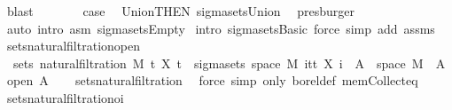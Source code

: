 \begin{isabellebody}
\ blast\isanewline
\ \ \ \ \isamarkupfalse%
\ \isamarkupfalse%
\ {\isacharquery}{\kern0pt}case\ \isamarkupfalse%
\ Union{\isacharparenleft}{\kern0pt}{}{\isacharparenright}{\kern0pt}{\isacharbrackleft}{\kern0pt}THEN\ sigma{\isacharunderscore}{\kern0pt}sets{\isachardot}{\kern0pt}Union{\isacharbrackright}{\kern0pt}\ \isamarkupfalse%
\ presburger\isanewline
\ \ \isamarkupfalse%
\ {\isacharparenleft}{\kern0pt}auto\ intro{\isacharcolon}{\kern0pt}\ asm\ sigma{\isacharunderscore}{\kern0pt}sets{\isachardot}{\kern0pt}Empty{\isacharparenright}{\kern0pt}\isanewline
{}\isamarkupfalse%
\ {\isacharparenleft}{\kern0pt}intro\ sigma{\isacharunderscore}{\kern0pt}sets{\isachardot}{\kern0pt}Basic{\isacharcomma}{\kern0pt}\ force\ simp\ add{\isacharcolon}{\kern0pt}\ assms{\isacharparenright}{\kern0pt}%
\endisatagproof
{\isafoldproof}%
%
\isadelimproof
\isanewline
%
\endisadelimproof
\isanewline
{}\isamarkupfalse%
\ sets{\isacharunderscore}{\kern0pt}natural{\isacharunderscore}{\kern0pt}filtration{\isacharunderscore}{\kern0pt}open{\isacharcolon}{\kern0pt}\ \isanewline
\ \ {\isachardoublequoteopen}sets\ {\isacharparenleft}{\kern0pt}natural{\isacharunderscore}{\kern0pt}filtration\ M\ t\ X\ t{\isacharparenright}{\kern0pt}\ {\isacharequal}{\kern0pt}\ sigma{\isacharunderscore}{\kern0pt}sets\ {\isacharparenleft}{\kern0pt}space\ M{\isacharparenright}{\kern0pt}\ {\isacharparenleft}{\kern0pt}{\isasymUnion}i{\isasymin}{\isacharbraceleft}{\kern0pt}tt{\isacharbraceright}{\kern0pt}{\isachardot}{\kern0pt}\ {\isacharbraceleft}{\kern0pt}X\ i\ {\isacharminus}{\kern0pt}{\isacharbackquote}{\kern0pt}\ A\ {\isasyminter}\ space\ M\ {\isacharbar}{\kern0pt}\ A{\isachardot}{\kern0pt}\ open\ A{\isacharbraceright}{\kern0pt}{\isacharparenright}{\kern0pt}{\isachardoublequoteclose}\isanewline
%
\isadelimproof
\ \ %
\endisadelimproof
%
\isatagproof
{}\isamarkupfalse%
\ sets{\isacharunderscore}{\kern0pt}natural{\isacharunderscore}{\kern0pt}filtration{\isacharprime}{\kern0pt}\ \isamarkupfalse%
\ {\isacharparenleft}{\kern0pt}force\ simp\ only{\isacharcolon}{\kern0pt}\ borel{\isacharunderscore}{\kern0pt}def\ mem{\isacharunderscore}{\kern0pt}Collect{\isacharunderscore}{\kern0pt}eq{\isacharparenright}{\kern0pt}%
\endisatagproof
{\isafoldproof}%
%
\isadelimproof
\isanewline
%
\endisadelimproof
\isanewline
{}\isamarkupfalse%
\ sets{\isacharunderscore}{\kern0pt}natural{\isacharunderscore}{\kern0pt}filtration{\isacharunderscore}{\kern0pt}oi{\isacharcolon}{\kern0pt}\ \isanewline

\end{isabellebody}

